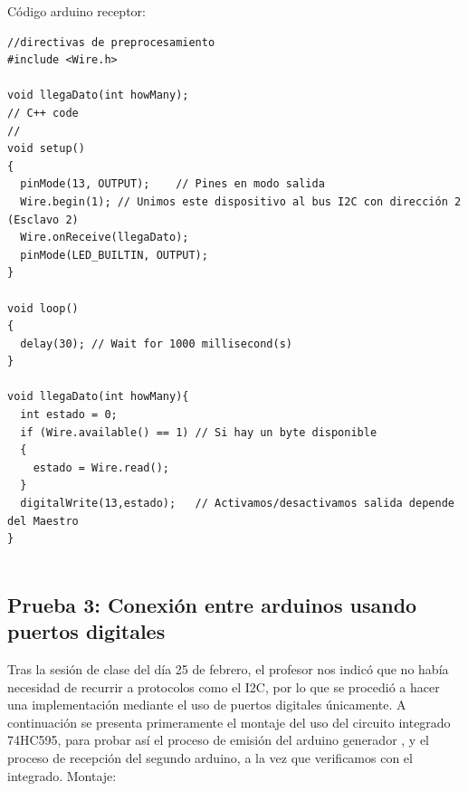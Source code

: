 \documentclass{article}
\begin{document}
Código arduino receptor:
\begin{lstlisting}[style=myArduino]//directivas de preprocesamiento
#include <Wire.h>

void llegaDato(int howMany);
// C++ code
//
void setup()
{
  pinMode(13, OUTPUT);    // Pines en modo salida
  Wire.begin(1); // Unimos este dispositivo al bus I2C con dirección 2 (Esclavo 2)
  Wire.onReceive(llegaDato);
  pinMode(LED_BUILTIN, OUTPUT);
}

void loop()
{
  delay(30); // Wait for 1000 millisecond(s)
}

void llegaDato(int howMany){  
  int estado = 0;
  if (Wire.available() == 1) // Si hay un byte disponible
  {
    estado = Wire.read();
  }
  digitalWrite(13,estado);   // Activamos/desactivamos salida depende del Maestro
}
 
\end{lstlisting}

\subsection{Prueba 3: Conexión entre arduinos usando puertos digitales}\label{intento3}
Tras la sesión de clase del día 25 de febrero, el profesor nos indicó que no había necesidad de recurrir a protocolos como el I2C, por lo que se procedió a hacer una implementación mediante el uso de puertos digitales únicamente. \newline A continuación se presenta primeramente el montaje del uso del circuito integrado 74HC595, para probar así el proceso de emisión del arduino generador , y el proceso de recepción del segundo arduino, a la vez que verificamos con el integrado.
\newline Montaje: \newline \newline \newline
\end{document}
